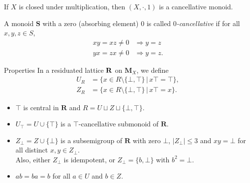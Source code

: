 \documentclass[professionalfont, handout, 10pt]{beamer} %
\theoremstyle{plain}
\theoremstyle{definition}
\begin{document}
\begin{frame}
    If $X$ is closed under multiplication, then $(X, \cdot, 1)$ is a cancellative monoid. \pause

    A monoid $\mathbf{S}$ with a zero (absorbing element) $0$ is called \emph{$0$-cancellative} if for all $x, y, z \in S$,
    \begin{align*}
        xy = xz \neq 0 & \Rightarrow y = z\\
        yx = zx \neq 0 & \Rightarrow y = z.
    \end{align*}
    
\end{frame}

\begin{frame}{Properties}
In a residuated lattice $\bf{R}$ on $\mathbf{M}_X$, we define
\begin{align*}
    U_R & = \{x \in R \setminus \{\bot, \top\} \, | \, x \top = \top\},\\
    Z_R & = \{x \in R \setminus \{\bot, \top\} \, | \,  x \top = x\}.
\end{align*}

\pause

\begin{itemize}
    \item $\top$ is central in $\mathbf{R}$ and $R = U \sqcup Z \sqcup \{\bot, \top\}$. \pause
    
    \item $U_{\top} = U \cup \{\top\}$ is a $\top$-cancellative submonoid of $\mathbf{R}$. \pause
    
    \item $Z_{\bot} = Z \cup \{\bot\}$ is a subsemigroup of $\mathbf{R}$ with zero $\bot$, $|Z_{\bot}| \leq 3$ and $xy = \bot$ for all distinct $x, y \in Z_{\bot}$.\\    
    Also, either $Z_{\bot}$ is idempotent, or $Z_{\bot} = \{b, \bot\}$ with $b^2=\bot$. \pause
    
    \item $ab = ba = b$ for all $a \in U$ and $b \in Z$.\pause
\end{itemize}


\end{frame}
\end{document}
